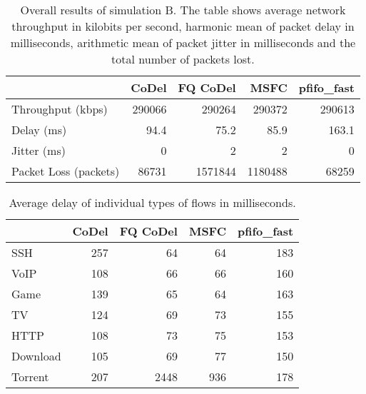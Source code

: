 \begin{table}[]
	\centering
	
	\caption{Overall results of simulation B. The table shows average network throughput in kilobits per second, harmonic mean of packet delay in milliseconds, arithmetic mean of packet jitter in milliseconds and the total number of packets lost.}
	\label{tab:results_B}
	\begin{tabular}{@{}lrrrr@{}}
		\toprule
								& CoDel & FQ CoDel & MSFC & pfifo\_fast  \\ \midrule
		Throughput (kbps)       & 290066    & 290264 & 290372   & 290613 \\
		Delay (ms)              & 94.4      & 75.2   & 85.9     & 163.1    \\
		Jitter (ms)             & 0         & 2      & 2        & 0      \\
		Packet Loss (packets)   & 86731     & 1571844& 1180488  & 68259  \\ \bottomrule
	\end{tabular}
\end{table}


\begin{table}
	\caption{Average delay of individual types of flows in milliseconds.}
	\label{tab:delay_B}
	\centering
	
	\begin{tabular}{@{}l|rrrr@{}}
		\toprule
						& CoDel & FQ CoDel & MSFC & pfifo\_fast  \\ \midrule
		SSH             &     257       &     64        &     64        &     183       \\
		VoIP            &     108       &     66        &     66        &     160       \\
		Game            &     139       &     65        &     64        &     163       \\
		TV              &     124       &     69        &     73        &     155       \\
		HTTP            &     108       &     73        &     75        &     153       \\
		Download        &     105       &     69        &     77        &     150       \\
		Torrent         &     207       &     2448      &     936      &     178       \\ \bottomrule
	\end{tabular}
\end{table}

